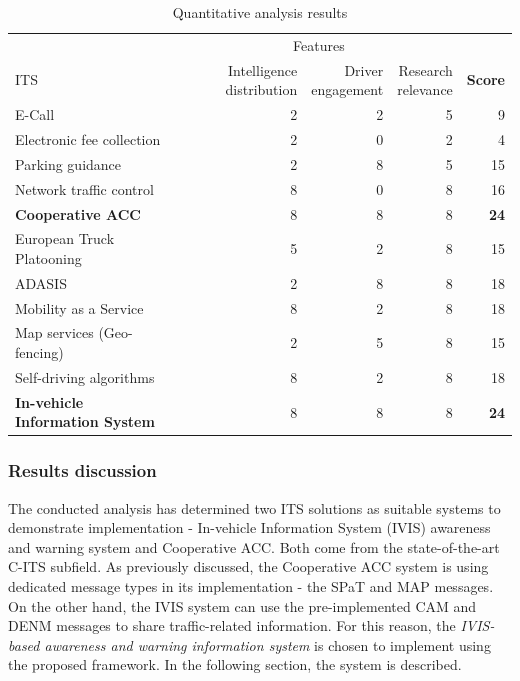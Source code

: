 \documentclass[0main.tex]{subfiles}
\begin{document}
\begin{table}[htbp]
    \caption{Quantitative analysis results}
    \renewcommand{\arraystretch}{1.4}
    \centering\begin{tabular}{l*{3}{r}r} \toprule
         & \multicolumn{3}{c}{Features} & \\ \cmidrule(rl){2-4}
        ITS & \multicolumn{1}{p{6em}}{Intelligence distribution} & \multicolumn{1}{p{6em}}{Driver \newline engagement} & \multicolumn{1}{p{6em}}{Research \newline relevance} & \textbf{Score} \\ \midrule
        E-Call & 2 & 2 & 5 & 9 \\ 
        Electronic fee collection & 2 & 0 & 2 & 4 \\
        Parking guidance & 2 & 8 & 5 & 15 \\
        Network traffic control & 8 & 0 & 8 & 16 \\
        \textbf{Cooperative ACC} & 8 & 8 & 8 & \textbf{24} \\
        European Truck Platooning & 5 & 2 & 8 & 15 \\
        ADASIS & 2 & 8 & 8 & 18 \\
        Mobility as a Service & 8 & 2 & 8 & 18 \\
        Map services (Geo-fencing) & 2 & 5 & 8 & 15 \\
        \multicolumn{1}{p{5em}}{Self-driving algorithms} \& Platooning & 8 & 2 & 8 & 18 \\
        \textbf{In-vehicle Information System} & 8 & 8 & 8 & \textbf{24} \\ \bottomrule
    \end{tabular}
    \label{qa-table}
\end{table}

\subsubsection{Results discussion}

The conducted analysis has determined two ITS solutions as suitable systems to demonstrate
implementation - In-vehicle Information System (IVIS) awareness and warning system and
Cooperative ACC. Both come from the state-of-the-art C-ITS subfield. As previously
discussed, the Cooperative ACC system is using dedicated message types in its implementation - the SPaT
and MAP messages. On the other hand, the IVIS system can use the pre-implemented CAM and DENM
messages to share traffic-related information. For this reason, the \emph{IVIS-based awareness
and warning information system} is chosen to implement using the proposed framework. In
the following section, the system is described.
\end{document}
